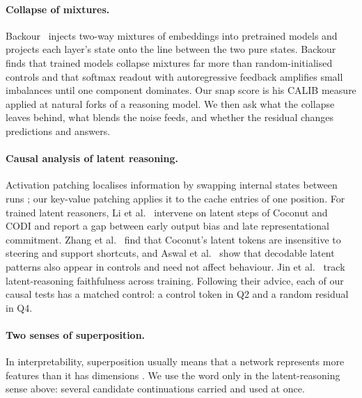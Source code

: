 \paragraph{Collapse of mixtures.}
Backour~\cite{backour2026dynamics} injects two-way mixtures of embeddings into pretrained models and projects each layer's
state onto the line between the two pure states.
Backour finds that trained models collapse mixtures far more than random-initialised controls and that softmax readout
with autoregressive feedback amplifies small imbalances until one component dominates.
Our snap score is his CALIB measure applied at natural forks of a reasoning model.
We then ask what the collapse leaves behind, what blends the noise feeds, and whether the residual changes
predictions and answers.

\paragraph{Causal analysis of latent reasoning.}
Activation patching localises information by swapping internal states between runs \cite{meng2022locating}; our
key-value patching applies it to the cache entries of one position.
For trained latent reasoners, Li et al.~\cite{li2026dynamics} intervene on latent steps of Coconut and CODI and report a gap
between early output bias and late representational commitment.
Zhang et al.~\cite{zhang2025latent} find that Coconut's latent tokens are insensitive to steering and support shortcuts, and
Aswal et al.~\cite{aswal2026observable} show that decodable latent patterns also appear in controls and need not affect behaviour.
Jin et al.~\cite{jin2026final} track latent-reasoning faithfulness across training.
Following their advice, each of our causal tests has a matched control: a control token in Q2 and a random residual
in Q4.

\paragraph{Two senses of superposition.}
In interpretability, superposition usually means that a network represents more features than it has dimensions
\cite{elhage2022toy}.
We use the word only in the latent-reasoning sense above: several candidate continuations carried and used at once.
